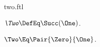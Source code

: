 \documentclass{stex}
\begin{document}
\begin{smodule}{two.ftl}



\begin{definition*}[forthel,for=Two]
  $\emph{\Two} \DefEq \Succ(\One)$.
\end{definition*}

\begin{proposition*}[forthel]
  $\Two \Eq \Pair{\Zero}{\One}$.
\end{proposition*}

\end{smodule}
\end{document}
